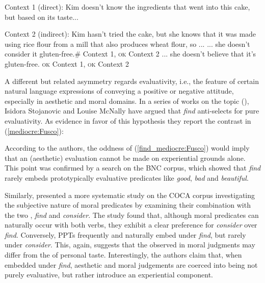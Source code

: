 \documentclass[output=paper,colorlinks,citecolor=brown]{langscibook}
\begin{document}
\ea \label{familiarity:Fusco}Context 1 (direct): Kim doesn’t know the ingredients that went into this cake, but based on its taste...

Context 2 (indirect): Kim hasn’t tried the cake, but she knows that it was made using rice flour from a mill that also produces wheat flour, so ...
\ea ... she doesn’t consider it gluten-free.\hfill \# Context 1, \textsc{ok} Context 2
\ex ... she doesn’t believe that it’s gluten-free. \hfill \textsc{ok} Context 1, \textsc{ok} Context 2
\z
\z

A different but related asymmetry regards evaluativity, i.e., the feature of certain natural language expressions of conveying a positive or negative attitude, especially in aesthetic and moral domains. In a series of works on the topic (\cite{mcnally_stojanovic_2017,stojanovic_2019,stojanovic_mcnally2023}), Isidora Stojanovic and Louise McNally have argued that \textit{find} anti-selects for pure evaluativity. As evidence in favor of this hypothesis they report the contrast in (\ref{mediocre:Fusco}):

\ea \label{mediocre:Fusco}
 \label{find_mediocre:Fusco}
\z
\z

According to the authors, the oddness of (\ref{find_mediocre:Fusco}) would imply that an (aesthetic) evaluation cannot be made on experiential grounds alone. This point was confirmed by a search on the BNC corpus, which showed that \textit{find} rarely embeds prototypically evaluative predicates like \textit{good}, \textit{bad} and \textit{beautiful}.

Similarly, \citet{stojanovic_mcnally2023} presented a more systematic study on the COCA corpus investigating the subjective nature of moral predicates by examining their combination with the two , \textit{find} and \textit{consider}. The study found that, although moral predicates can naturally occur with both verbs, they exhibit a clear preference for \textit{consider} over \textit{find}. Conversely, PPTs frequently and naturally embed under \textit{find}, but rarely under \textit{consider}. This, again, suggests that the  observed in moral judgments may differ from the  of personal taste. Interestingly, the authors claim that, when embedded under \textit{find}, aesthetic and moral judgements are coerced into being not purely evaluative, but rather introduce an experiential component. 
\end{document}

